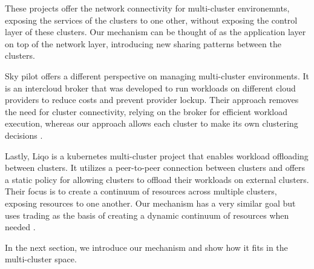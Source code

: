 These projects offer the network connectivity for multi-cluster environemnts,
exposing the services of the clusters to one other, without exposing the
control layer of these clusters. Our mechanism can be thought of as the
application layer on top of the network layer, introducing new sharing patterns
between the clusters.

Sky pilot offers a different perspective on managing multi-cluster
environments. It is an intercloud broker that was developed to run workloads on
different cloud providers to reduce costs and prevent provider lockup. Their
approach removes the need for cluster connectivity, relying on the
broker for efficient workload execution, whereas our approach allows each
cluster to make its own clustering decisions \cite{yang_skypilot_nodate}.

Lastly, Liqo is a kubernetes multi-cluster project that enables workload
offloading between clusters. It utilizes a peer-to-peer connection between
clusters and offers a static policy for allowing clusters to offload their
workloads on external clusters. Their focus is to create a continuum of
resources across multiple clusters, exposing resources to one another. Our
mechanism has a very similar goal but uses trading as the basis of creating a
dynamic continuum of resources when needed \cite{iorio_computing_2023,
noauthor_liqo_nodate}. 

In the next section, we introduce our mechanism and show how it fits in the
multi-cluster space.
